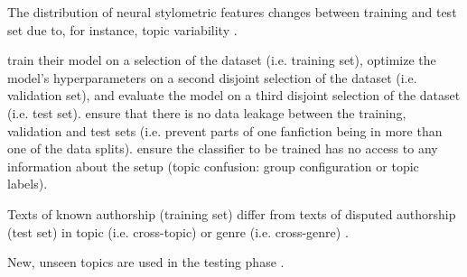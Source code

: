 \begin{definition}
    The distribution of neural stylometric features changes between training and test set due to, for instance, topic variability \citep{boenninghoff_o2d2_2021}.
\end{definition}

\begin{definition}
    \citet{bischoff_importance_2020,altakrori_topic_2021,boenninghoff_o2d2_2021} train their model on a selection of the dataset (i.e. training set), 
    optimize the model's hyperparameters on a second disjoint selection of the dataset (i.e. validation set),
    and evaluate the model on a third disjoint selection of the dataset (i.e. test set).
    \citet{bischoff_importance_2020} ensure that there is no data leakage between the training, validation and test sets 
    (i.e. prevent parts of one fanfiction being in more than one of the data splits).
    \citet{altakrori_topic_2021} ensure the classifier to be trained has no access to any information about the setup 
    (topic confusion: group configuration or topic labels).
\end{definition}

\begin{definition}
    Texts of known authorship (training set) differ from texts of disputed authorship (test set) 
    in topic (i.e. cross-topic) or genre (i.e. cross-genre) 
    \citep{barlas_cross_domain_2020}.
\end{definition}

\begin{definition}
    New, unseen topics are used in the testing phase \citep{altakrori_topic_2021}.
\end{definition}